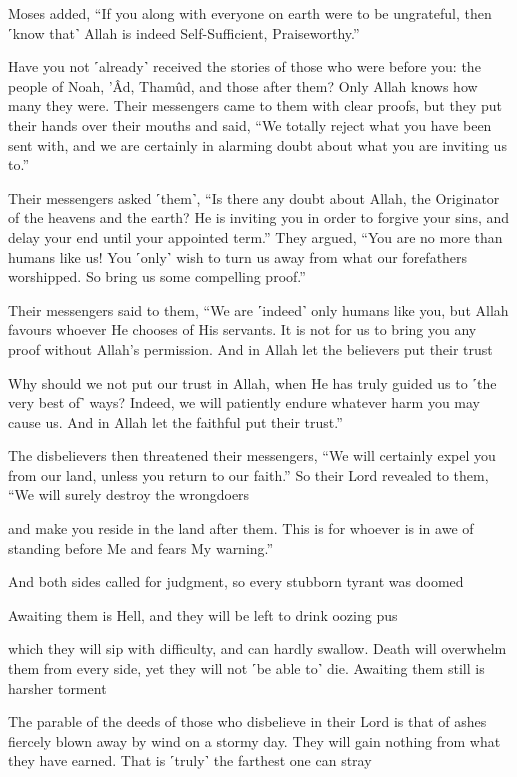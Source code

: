 Moses added, “If you along with everyone on earth were to be ungrateful, then ˹know that˺ Allah is indeed Self-Sufficient, Praiseworthy.”

Have you not ˹already˺ received the stories of those who were before you: the people of Noah, ’Âd, Thamûd, and those after them? Only Allah knows how many they were. Their messengers came to them with clear proofs, but they put their hands over their mouths and said, “We totally reject what you have been sent with, and we are certainly in alarming doubt about what you are inviting us to.”

Their messengers asked ˹them˺, “Is there any doubt about Allah, the Originator of the heavens and the earth? He is inviting you in order to forgive your sins, and delay your end until your appointed term.” They argued, “You are no more than humans like us! You ˹only˺ wish to turn us away from what our forefathers worshipped. So bring us some compelling proof.”

Their messengers said to them, “We are ˹indeed˺ only humans like you, but Allah favours whoever He chooses of His servants. It is not for us to bring you any proof without Allah’s permission. And in Allah let the believers put their trust

Why should we not put our trust in Allah, when He has truly guided us to ˹the very best of˺ ways? Indeed, we will patiently endure whatever harm you may cause us. And in Allah let the faithful put their trust.”

The disbelievers then threatened their messengers, “We will certainly expel you from our land, unless you return to our faith.” So their Lord revealed to them, “We will surely destroy the wrongdoers

and make you reside in the land after them. This is for whoever is in awe of standing before Me and fears My warning.”

And both sides called for judgment, so every stubborn tyrant was doomed

Awaiting them is Hell, and they will be left to drink oozing pus

which they will sip with difficulty, and can hardly swallow. Death will overwhelm them from every side, yet they will not ˹be able to˺ die. Awaiting them still is harsher torment

The parable of the deeds of those who disbelieve in their Lord is that of ashes fiercely blown away by wind on a stormy day. They will gain nothing from what they have earned. That is ˹truly˺ the farthest one can stray

